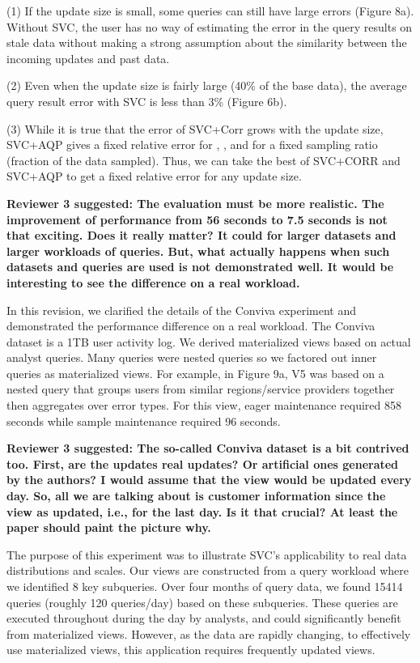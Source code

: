 \noindent  (1) If the update size is small, some queries can still have large errors (Figure 8a). Without SVC, the user has no way of estimating the error in the query results on stale data without making a strong assumption about the similarity between the incoming updates and past data. 

\noindent (2) Even when the update size is fairly large (40\% of the base data), the average query result error with SVC is less than 3\% (Figure 6b).

\noindent (3) While it is true that the error of SVC+Corr grows with the update size, SVC+AQP gives a fixed relative error for \sumfunc, \countfunc, and \avgfunc for a fixed sampling ratio (fraction of the data sampled). Thus, we can take the best of SVC+CORR and SVC+AQP to get a fixed relative error for any update size. 


\vspace{1.5em}

\textbf{Reviewer 3 suggested: The evaluation must be more realistic. The improvement of performance from 56 seconds to 7.5 seconds is not that exciting. Does it really matter? It could for larger datasets and larger workloads of queries. But, what actually happens when such datasets and queries are used is not demonstrated well. It would be interesting to see the difference on a real workload.}


In this revision, we clarified the details of the Conviva experiment and demonstrated the performance difference on a real workload. The Conviva dataset is a 1TB user activity log. We derived materialized views based on actual analyst queries. Many queries were nested queries so we factored out inner queries as materialized views. For example, in Figure 9a, V5 was based on a nested query that groups users from similar regions/service providers together then aggregates over error types. For this view, eager maintenance required 858 seconds while sample maintenance required 96 seconds. 

\vspace{1.5em}

\textbf{Reviewer 3 suggested: The so-called Conviva dataset is a bit contrived too. First, are the updates real updates? Or artificial ones generated by the authors? I would assume that the view would be updated every day. So, all we are talking about is customer information since the view as updated, i.e., for the last day. Is it that crucial? At least the paper should paint the picture why.}

The purpose of this experiment was to illustrate SVC's applicability to real data distributions and scales. 
Our views are constructed from a query workload where we identified 8 key subqueries.
Over four months of query data, we found 15414 queries (roughly 120 queries/day) based on these subqueries.
These queries are executed throughout during the day by analysts, and could significantly benefit from materialized views. 
However, as the data are rapidly changing, to effectively use materialized views, this application requires frequently updated views.

